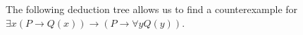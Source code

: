 

\setcounter{section}{2}
\setcounter{subsection}{2}
\setcounter{dfn}{7}

\begin{exl}
\label{exl:CounterexamplePred}
The following deduction tree allows us to find a counterexample for $\exists x(P \to Q(x)) \to (P \to \forall y Q(y))$.
\begin{prooftree}
\end{prooftree}
\end{exl}


